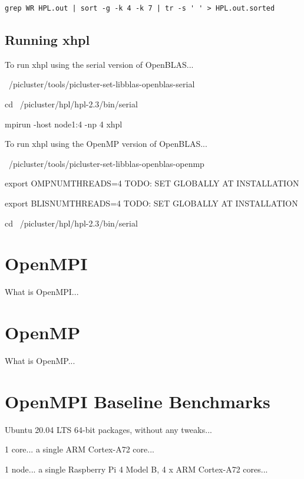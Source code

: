 \documentclass{article}
\begin{document}
\begin{verbatim}
grep WR HPL.out | sort -g -k 4 -k 7 | tr -s ' ' > HPL.out.sorted
\end{verbatim}






\subsection{Running xhpl}

To run xhpl using the serial version of OpenBLAS...

~/picluster/tools/picluster-set-libblas-openblas-serial

cd ~/picluster/hpl/hpl-2.3/bin/serial

mpirun -host node1:4 -np 4 xhpl



To run xhpl using the OpenMP version of OpenBLAS...

~/picluster/tools/picluster-set-libblas-openblas-openmp

export OMPNUMTHREADS=4 TODO: SET GLOBALLY AT INSTALLATION

export BLISNUMTHREADS=4 TODO: SET GLOBALLY AT INSTALLATION

cd ~/picluster/hpl/hpl-2.3/bin/serial



\section{OpenMPI}

What is OpenMPI...



\section{OpenMP}

What is OpenMP...



\section{OpenMPI Baseline Benchmarks}

Ubuntu 20.04 LTS 64-bit packages, without any tweaks...

1 core... a single ARM Cortex-A72 core...

1 node... a single Raspberry Pi 4 Model B, 4 x ARM Cortex-A72 cores...
\end{document}

